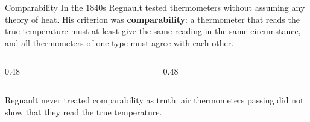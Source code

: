 \documentclass[aspectratio=169,11pt]{beamer}
\begin{document}
\begin{frame}[label=compar]{Comparability}
In the 1840s Regnault tested thermometers without assuming any theory of heat. His criterion was \textbf{comparability}: a thermometer that reads the true temperature must at least give the same reading in the same circumstance, and all thermometers of one type must agree with each other.

\vspace{0.6em}
\begin{columns}[T]
\begin{column}{0.48\textwidth}
\begin{center}
\end{center}
\end{column}
\begin{column}{0.48\textwidth}
\begin{center}
\end{center}
\end{column}
\end{columns}

\vspace{0.6em}
{\small Regnault never treated comparability as truth: air thermometers passing did not show that they read the true temperature.}
\end{frame}
\end{document}
